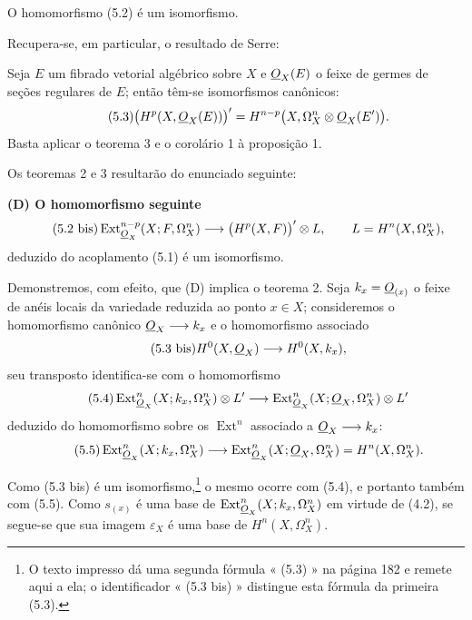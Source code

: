  O homomorfismo (5.2) é um isomorfismo.

Recupera-se, em particular, o resultado de Serre:

 Seja $E$ um fibrado vetorial algébrico sobre $X$ e
$\underline{O}_X(E)$ o feixe de germes de seções regulares de $E$; então têm-se
isomorfismos canônicos:
\begin{equation}\tag{5.3}
  \bigl(H^{p}(X,\underline{O}_X(E))\bigr)'
  =H^{n-p}\bigl(X,\Omega_X^{n}\otimes\underline{O}_X(E')\bigr).
\end{equation}
Basta aplicar o teorema 3 e o corolário 1 à proposição 1.

Os teoremas 2 e 3 resultarão do enunciado seguinte:

\noindent\textbf{(D) O homomorfismo seguinte}
\begin{equation}\tag{5.2 bis}
  \operatorname{Ext}_{\underline{O}_X}^{n-p}(X;F,\Omega_X^{n})
  \longrightarrow\bigl(H^{p}(X,F)\bigr)'\otimes L,
  \qquad L=H^{n}(X,\Omega_X^{n}),
\end{equation}
deduzido do acoplamento (5.1) é um isomorfismo.

Demonstremos, com efeito, que (D) implica o teorema 2. Seja
$k_x=\underline{O}_{(x)}$ o feixe de anéis locais da variedade reduzida ao ponto
$x\in X$; consideremos o homomorfismo canônico
$\underline{O}_X\longrightarrow k_x$ e o homomorfismo associado
\begin{equation}\tag{5.3 bis}
  H^{0}(X,\underline{O}_X)\longrightarrow H^{0}(X,k_x),
\end{equation}
seu transposto identifica-se com o homomorfismo
\begin{equation}\tag{5.4}
  \operatorname{Ext}_{\underline{O}_X}^{n}(X;k_x,\Omega_X^{n})\otimes L'
  \longrightarrow
  \operatorname{Ext}_{\underline{O}_X}^{n}(X;\underline{O}_X,\Omega_X^{n})\otimes L'
\end{equation}
deduzido do homomorfismo sobre os $\operatorname{Ext}^{n}$ associado a
$\underline{O}_X\longrightarrow k_x$:
\begin{equation}\tag{5.5}
  \operatorname{Ext}_{\underline{O}_X}^{n}(X;k_x,\Omega_X^{n})
  \longrightarrow
  \operatorname{Ext}_{\underline{O}_X}^{n}(X;\underline{O}_X,\Omega_X^{n})
  =H^{n}(X,\Omega_X^{n}).
\end{equation}

Como (5.3 bis) é um isomorfismo,\footnote{O texto impresso dá uma
segunda fórmula « (5.3) » na página 182 e remete aqui a ela; o identificador
« (5.3 bis) » distingue esta fórmula da primeira (5.3).} o mesmo ocorre
com (5.4), e portanto também com (5.5). Como $s_{(x)}$ é uma base de
$\operatorname{Ext}_{\underline{O}_X}^{n}(X;k_x,\Omega_X^{n})$ em virtude de (4.2), se
segue-se que sua imagem $\varepsilon_X$ é uma base de
$H^{n}(X,\Omega_X^{n})$.

